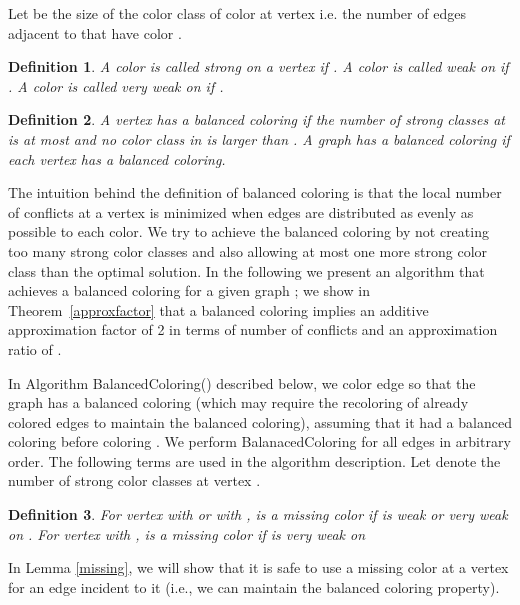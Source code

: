 \documentclass[titlepage, 11pt]{article}
\newtheorem{definition}{Definition}
\begin{document}
Let  be the size of the color class of color  at vertex  i.e. the number of edges adjacent to  that have color .

\begin{definition}
A color  is called \emph{strong} on a vertex  if . A color  is called weak on  
if  . A color  is called very weak on  if .
\end{definition}
\begin{definition}
A vertex  has a \emph{balanced} coloring if the number of strong classes at  is at most  and no color class in  is larger than . A graph  has a balanced coloring if each vertex  has a balanced coloring.   
\end{definition}

The intuition behind the definition of balanced coloring is that the local number of conflicts at a vertex is minimized when
edges are distributed as evenly as possible to each color. We try to achieve the balanced coloring
by not creating too many strong color classes and also allowing at most one more strong color class than the optimal solution.
In the following we present an algorithm that achieves a balanced coloring for a given graph ;  we show in Theorem~\ref{approxfactor} that a balanced coloring implies an additive approximation factor of 2 in terms of number of conflicts and an approximation ratio of . 

In Algorithm {\sc BalancedColoring}() described below, we color edge  so that the graph has a balanced coloring 
(which may require the recoloring of already colored edges to maintain the balanced coloring),
assuming that it had a balanced coloring before coloring .
We perform {\sc BalanacedColoring} for all edges in arbitrary order.
The following terms are used in the algorithm description.
Let  denote the number of strong color classes at vertex .
\begin{definition}\label{def:weak}
For vertex  with  or with ,  is a missing color if  is weak or very weak on .  For vertex  with ,  is a missing color if  is very weak on 
\end{definition}

In Lemma \ref{missing}, we will show that it is safe to use a missing color at a vertex 
for an edge incident to it (i.e., we can maintain the balanced coloring property).
\end{document}

